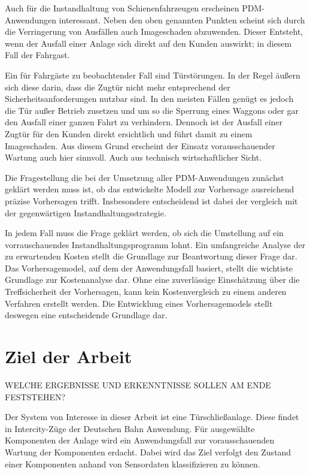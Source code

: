Auch für die Instandhaltung von Schienenfahrzeugen erscheinen PDM-Anwendungen interessant. Neben den oben genannten Punkten scheint sich durch die Verringerung von Ausfällen auch Imageschaden abzuwenden. Dieser Entsteht, wenn  der Ausfall einer Anlage sich direkt auf den Kunden auswirkt; in diesem Fall der Fahrgast.

Ein für Fahrgäste zu beobachtender Fall sind Türstörungen. In der Regel äußern sich diese darin, dass die Zugtür nicht mehr entsprechend der Sicherheitsanforderungen nutzbar sind. In den meisten Fällen genügt es jedoch die Tür außer Betrieb zusetzen und um so die Sperrung eines Waggons oder gar den Ausfall einer ganzen Fahrt zu verhindern. Dennoch ist der Ausfall einer Zugtür für den Kunden direkt ersichtlich und führt damit zu einem Imageschaden. Aus diesem Grund erscheint der Einsatz vorausschauender Wartung auch hier sinnvoll. Auch aus technisch wirtschaftlicher Sicht.

Die Fragestellung die bei der Umsetzung aller PDM-Anwendungen zunächst geklärt werden muss ist, ob das entwickelte Modell zur Vorhersage ausreichend präzise Vorhersagen trifft. Insbesondere entscheidend ist dabei der vergleich mit der gegenwärtigen Instandhaltungsstrategie.

In jedem Fall muss die Frage geklärt werden, ob sich die Umstellung auf ein vorrauschauendes Instandhaltungsprogramm lohnt. Ein umfangreiche Analyse der zu erwartenden Kosten stellt die Grundlage zur Beantwortung dieser Frage dar. Das Vorhersagemodel, auf dem der Anwendungsfall basiert, stellt die wichtiste Grundlage zur Kostenanalyse dar. Ohne eine zuverlässige Einschätzung über die Treffsicherheit der Vorhersagen, kann kein Kostenvergleich zu einem anderen Verfahren erstellt werden. Die Entwicklung eines Vorhersagemodels stellt deswegen eine entscheidende Grundlage dar. 


\section{Ziel der Arbeit}
\label{sec:ziel}
WELCHE ERGEBNISSE UND ERKENNTNISSE SOLLEN AM ENDE FESTSTEHEN?

Der System von Interesse in dieser Arbeit ist eine Türschließanlage. Diese findet in Intercity-Züge der Deutschen Bahn Anwendung. Für ausgewählte Komponenten der Anlage wird ein Anwendungsfall zur vorausschauenden Wartung der Komponenten erdacht. Dabei wird das Ziel verfolgt den Zustand einer Komponenten anhand von Sensordaten klassifizieren zu können. 

